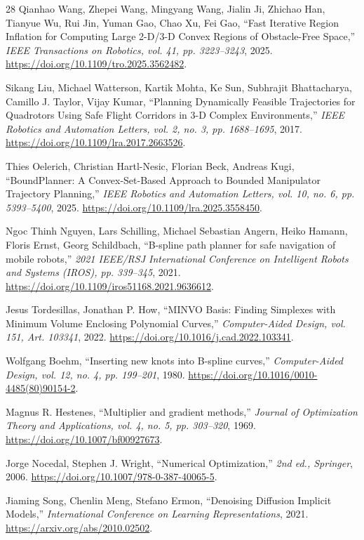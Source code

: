 \documentclass[journal]{IEEEtran}
\begin{document}
\begin{thebibliography}{28}
Qianhao Wang, Zhepei Wang, Mingyang Wang, Jialin Ji, Zhichao Han, Tianyue Wu, Rui Jin, Yuman Gao, Chao Xu, Fei Gao, ``Fast Iterative Region Inflation for Computing Large 2-D/3-D Convex Regions of Obstacle-Free Space,'' \emph{IEEE Transactions on Robotics, vol. 41, pp. 3223--3243}, 2025.
\url{https://doi.org/10.1109/tro.2025.3562482}.

Sikang Liu, Michael Watterson, Kartik Mohta, Ke Sun, Subhrajit Bhattacharya, Camillo J. Taylor, Vijay Kumar, ``Planning Dynamically Feasible Trajectories for Quadrotors Using Safe Flight Corridors in 3-D Complex Environments,'' \emph{IEEE Robotics and Automation Letters, vol. 2, no. 3, pp. 1688--1695}, 2017.
\url{https://doi.org/10.1109/lra.2017.2663526}.

Thies Oelerich, Christian Hartl-Nesic, Florian Beck, Andreas Kugi, ``BoundPlanner: A Convex-Set-Based Approach to Bounded Manipulator Trajectory Planning,'' \emph{IEEE Robotics and Automation Letters, vol. 10, no. 6, pp. 5393--5400}, 2025.
\url{https://doi.org/10.1109/lra.2025.3558450}.

Ngoc Thinh Nguyen, Lars Schilling, Michael Sebastian Angern, Heiko Hamann, Floris Ernst, Georg Schildbach, ``B-spline path planner for safe navigation of mobile robots,'' \emph{2021 IEEE/RSJ International Conference on Intelligent Robots and Systems (IROS), pp. 339--345}, 2021.
\url{https://doi.org/10.1109/iros51168.2021.9636612}.

Jesus Tordesillas, Jonathan P. How, ``MINVO Basis: Finding Simplexes with Minimum Volume Enclosing Polynomial Curves,'' \emph{Computer-Aided Design, vol. 151, Art. 103341}, 2022.
\url{https://doi.org/10.1016/j.cad.2022.103341}.

Wolfgang Boehm, ``Inserting new knots into B-spline curves,'' \emph{Computer-Aided Design, vol. 12, no. 4, pp. 199--201}, 1980.
\url{https://doi.org/10.1016/0010-4485(80)90154-2}.

Magnus R. Hestenes, ``Multiplier and gradient methods,'' \emph{Journal of Optimization Theory and Applications, vol. 4, no. 5, pp. 303--320}, 1969.
\url{https://doi.org/10.1007/bf00927673}.

Jorge Nocedal, Stephen J. Wright, ``Numerical Optimization,'' \emph{2nd ed., Springer}, 2006.
\url{https://doi.org/10.1007/978-0-387-40065-5}.

Jiaming Song, Chenlin Meng, Stefano Ermon, ``Denoising Diffusion Implicit Models,'' \emph{International Conference on Learning Representations}, 2021.
\url{https://arxiv.org/abs/2010.02502}.


\end{thebibliography}
\end{document}
